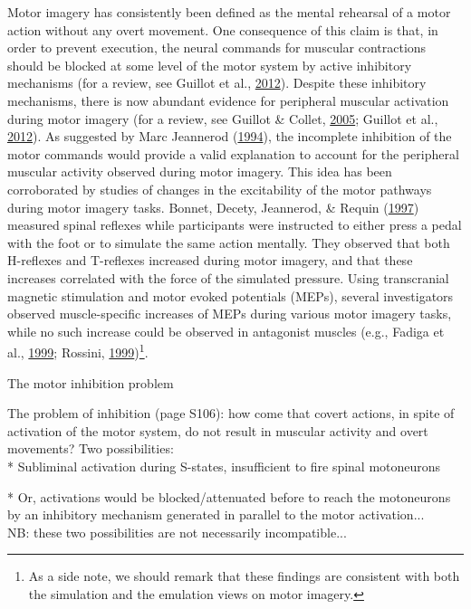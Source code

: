 \documentclass[a4paper,12pt,twoside,openright,oldfontcommands]{memoir}
\let\rmarkdownfootnote\footnote%
\def\footnote{\protect\rmarkdownfootnote}
\begin{document}
Motor imagery has consistently been defined as the mental rehearsal of a
motor action without any overt movement. One consequence of this claim
is that, in order to prevent execution, the neural commands for muscular
contractions should be blocked at some level of the motor system by
active inhibitory mechanisms (for a review, see Guillot et al.,
\protect\hyperlink{ref-guillot_imagining_2012}{2012}). Despite these
inhibitory mechanisms, there is now abundant evidence for peripheral
muscular activation during motor imagery (for a review, see Guillot \&
Collet, \protect\hyperlink{ref-guillot_contribution_2005}{2005}; Guillot
et al., \protect\hyperlink{ref-guillot_imagining_2012}{2012}). As
suggested by Marc Jeannerod
(\protect\hyperlink{ref-jeannerod_representing_1994}{1994}), the
incomplete inhibition of the motor commands would provide a valid
explanation to account for the peripheral muscular activity observed
during motor imagery. This idea has been corroborated by studies of
changes in the excitability of the motor pathways during motor imagery
tasks. Bonnet, Decety, Jeannerod, \& Requin
(\protect\hyperlink{ref-bonnet_mental_1997}{1997}) measured spinal
reflexes while participants were instructed to either press a pedal with
the foot or to simulate the same action mentally. They observed that
both H-reflexes and T-reflexes increased during motor imagery, and that
these increases correlated with the force of the simulated pressure.
Using transcranial magnetic stimulation and motor evoked potentials
(MEPs), several investigators observed muscle-specific increases of MEPs
during various motor imagery tasks, while no such increase could be
observed in antagonist muscles (e.g., Fadiga et al.,
\protect\hyperlink{ref-fadiga_corticospinal_1999}{1999}; Rossini,
\protect\hyperlink{ref-rossini_corticospinal_1999}{1999})\footnote{As a
  side note, we should remark that these findings are consistent with
  both the simulation and the emulation views on motor imagery.}.

\vspace{2mm}

\begin{mybox}[label = inhibition]{The motor inhibition problem}

The problem of inhibition (page S106): how come that covert actions, in spite of activation of the motor system, do not result in muscular activity and overt movements? Two possibilities:\\

*   Subliminal activation during S-states, insufficient to fire spinal motoneurons

*   Or, activations would be blocked/attenuated before to reach the motoneurons by an inhibitory mechanism generated in parallel to the motor activation...\\

NB: these two possibilities are not necessarily incompatible...

\end{mybox}
\end{document}
